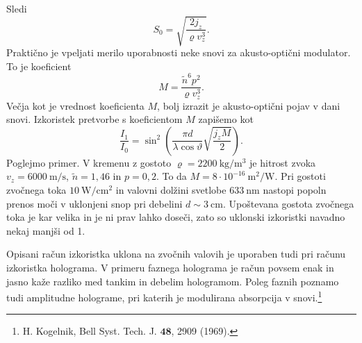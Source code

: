 Sledi 
\begin{equation}
S_{0}=\sqrt{\frac{2j_{z}}{\varrho v_{z}^{3}}}.
\label{7.50}
\end{equation}
Praktično je vpeljati merilo uporabnosti neke snovi za akusto-optični modulator. To je 
koeficient 
\begin{equation}
M=\frac{\tilde{n}^{6}p^{2}}{\varrho v_{z}^{3}}.
\label{7.51}
\end{equation}
Večja kot je vrednost koeficienta $M$, bolj izrazit je akusto-optični pojav v dani snovi. 
Izkoristek pretvorbe s koeficientom $M$ zapišemo kot
\begin{equation}
 \frac{I_{1}}{I_{0}}=\sin^{2}\left(\frac{\pi d}{\lambda\cos\vartheta}\sqrt{\frac{j_z M}{2}}\right).
\end{equation}
Poglejmo primer. V kremenu z gostoto $\varrho=2200~\si{\kilo\gram/\metre^3}$ 
je hitrost zvoka $v_{z}=6000~\si{\metre/\second}$,
$\tilde{n}=1,46$ in $p=0,2$. To da $M=8\cdot10^{-16}~\si{\metre^2/\watt}$.
Pri gostoti zvočnega toka $10~\si{\watt/\centi\metre^2}$ in valovni dolžini svetlobe 
$633~\si{\nano\metre}$ nastopi popoln prenos moči v uklonjeni snop pri 
debelini $d \sim 3~\si{\centi\metre}$. Upoštevana gostota zvočnega toka je kar velika
in je ni prav lahko doseči, zato so uklonski izkoristki navadno nekaj manjši od 1.

\begin{remark}
Opisani račun izkoristka uklona na zvočnih valovih je uporaben tudi
pri računu izkoristka holograma. V primeru faznega holograma je račun
povsem enak in jasno kaže razliko med tankim in debelim hologramom.
Poleg faznih poznamo tudi amplitudne holograme, pri katerih je 
modulirana absorpcija v snovi.\footnote{H.
Kogelnik, Bell Syst. Tech. J. $\mathbf{48}$, 2909 (1969).}
\end{remark}

